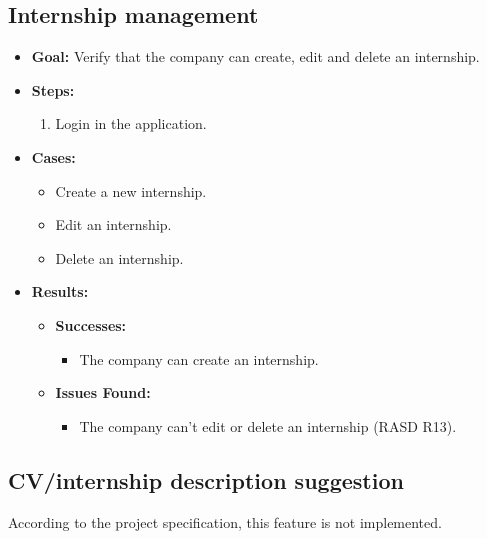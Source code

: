 \subsection{Internship management}
\begin{itemize}
    \item \textbf{Goal:} Verify that the company can create, edit and delete an internship.

    \item \textbf{Steps:}
    \begin{enumerate}
        \item Login in the application.

    \end{enumerate}
    \item \textbf{Cases:}
    \begin{itemize}
        \item Create a new internship.
        \item Edit an internship.
        \item Delete an internship.
    \end{itemize}
    \item \textbf{Results:}
    \begin{itemize}
        \item \textbf{Successes:}
        \begin{itemize}
            \item The company can create an internship.
        \end{itemize}
        \item \textbf{Issues Found:}
        \begin{itemize}
            \item The company can't edit or delete an internship (RASD R13).
        \end{itemize}
    \end{itemize}
\end{itemize}

\subsection{CV/internship description suggestion}
According to the project specification, this feature is not implemented.


